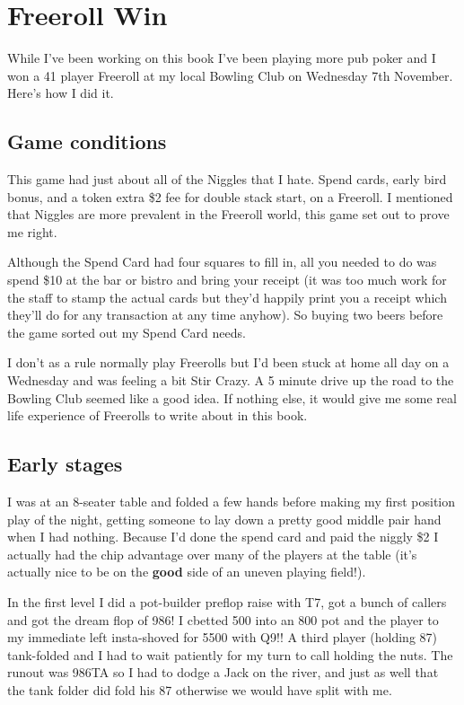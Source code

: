 \chapter{Freeroll Win}


While I've been working on this book I've been playing more
pub poker and I won a 41 player Freeroll at my local
Bowling Club on Wednesday 7th November. Here's how I
did it.

\section{Game conditions}

This game had just about all of the Niggles that I hate.
Spend cards, early bird bonus, and a token extra \$2 fee
for double stack start, on a Freeroll. I mentioned that
Niggles are more prevalent in the Freeroll world, this
game set out to prove me right.

Although the Spend Card had four squares to fill in, all you
needed to do was spend \$10 at the bar or bistro and bring your
receipt (it was too much work for the staff to stamp the actual
cards but they'd happily print you a receipt which they'll do
for any transaction at any time anyhow). So buying two beers
before the game sorted out my Spend Card needs.

I don't as a rule normally play Freerolls but I'd been stuck
at home all day on a Wednesday and was feeling a bit Stir Crazy.
A 5 minute drive up the road to the Bowling Club seemed like
a good idea. If nothing else, it would give me some real life
experience of Freerolls to write about in this book.


\section{Early stages}

I was at an 8-seater table and folded a few hands before
making my first position play of the night, getting someone
to lay down a pretty good middle pair hand when I had nothing.
Because I'd done the spend card and paid the niggly \$2 I actually
had the chip advantage over many of the players at the table
(it's actually nice to be on the \textbf{good} side of an
uneven playing field!).

In the first level I did a pot-builder preflop raise with T7,
got a bunch of callers and got the dream flop of 986! I cbetted
500 into an 800 pot and the player to my immediate left
insta-shoved for 5500 with Q9!! A third player (holding 87) tank-folded
and I had to wait patiently for my turn to call holding the nuts.
The runout was 986TA so I had to dodge a Jack on the river,
and just as well that the tank folder did fold his 87 otherwise we
would have split with me.

